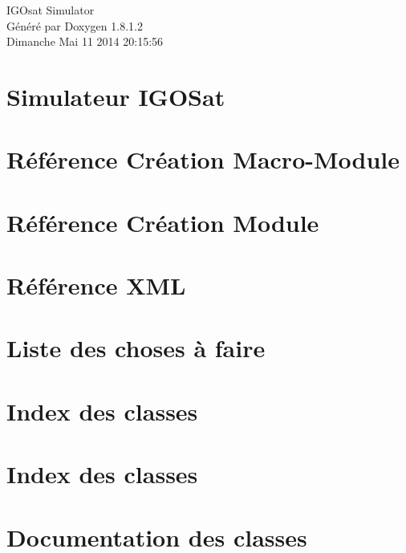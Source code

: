 \documentclass{book}
\begin{document}
\hypersetup{pageanchor=false,citecolor=blue}
\begin{titlepage}
\vspace*{7cm}
\begin{center}
{\Large I\-G\-Osat Simulator }\\
\vspace*{1cm}
{\large Généré par Doxygen 1.8.1.2}\\
\vspace*{0.5cm}
{\small Dimanche Mai 11 2014 20:15:56}\\
\end{center}
\end{titlepage}
\clearemptydoublepage
{}
\tableofcontents
\clearemptydoublepage
{}
\hypersetup{pageanchor=true,citecolor=blue}
\chapter{Simulateur I\-G\-O\-Sat}
\label{index}\hypertarget{index}{}
\chapter{Référence Création Macro-\/\-Module}
\label{docMacroModule}
\hypertarget{docMacroModule}{}

\chapter{Référence Création Module}
\label{docModule}
\hypertarget{docModule}{}

\chapter{Référence X\-M\-L}
\label{xmlRef}
\hypertarget{xmlRef}{}

\chapter{Liste des choses à faire}
\label{todo}
\hypertarget{todo}{}

\chapter{Index des classes}

\chapter{Index des classes}

\chapter{Documentation des classes}





















\printindex
\end{document}
